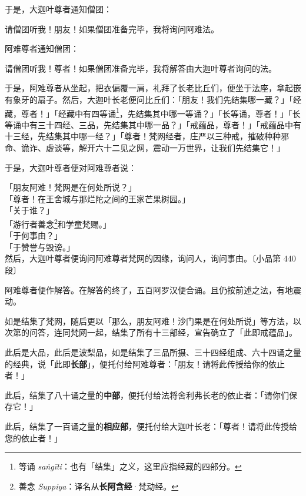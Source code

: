 于是，大迦叶尊者通知僧团：

\begin{quoting}请僧团听我！朋友！如果僧团准备完毕，我将询问阿难法。\end{quoting}

阿难尊者通知僧团：

\begin{quoting}请僧团听我！尊者！如果僧团准备完毕，我将解答由大迦叶尊者询问的法。\end{quoting}

于是，阿难尊者从坐起，把衣偏覆一肩，礼拜了长老比丘们，便坐于法座，拿起嵌有象牙的扇子。然后，大迦叶长老便问比丘们：「朋友！我们先结集哪一藏？」「经藏，尊者！」「经藏中有四等诵\footnote{等诵 \textit{saṅgīti}：也有「结集」之义，这里应指经藏的四部分。}，先结集其中哪一等诵？」「长等诵，尊者！」「长等诵中有三十四经、三品，先结集其中哪一品？」「戒蕴品，尊者！」「戒蕴品中有十三经，先结集其中哪一经？」「尊者！梵网经者，庄严以三种戒，摧破种种邪命、诡诈、虚谈等，解开六十二见之网，震动一万世界，让我们先结集它！」

于是，大迦叶尊者便对阿难尊者说：

\begin{quoting}「朋友阿难！梵网是在何处所说？」\\「尊者！在王舍城与那烂陀之间的王家芒果树园。」\\「关于谁？」\\「游行者善念\footnote{善念 \textit{Suppiya}：译名从\textbf{长阿含经}·梵动经。}和学童梵赐。」\\「于何事由？」\\「于赞誉与毁谤。」\\然后，大迦叶尊者便询问阿难尊者梵网的因缘，询问人，询问事由。{\bluefootnotesize 〔小品第 440 段〕}\end{quoting}

阿难尊者便作解答。在解答的终了，五百阿罗汉便合诵。且仍按前述之法，有地震动。

如是结集了梵网，随后更以「那么，朋友阿难！沙门果是在何处所说」等方法，以次第的问答，连同梵网一起，结集了所有十三部经，宣告确立了「此即戒蕴品」。

此后是大品，此后是波梨品，如是结集了三品所摄、三十四经组成、六十四诵之量的经典，说「此即\textbf{长部}」，便托付给阿难尊者：「朋友！请将此传授给你的依止者！」

此后，结集了八十诵之量的\textbf{中部}，便托付给法将舍利弗长老的依止者：「请你们保存它！」

此后，结集了一百诵之量的\textbf{相应部}，便托付给大迦叶长老：「尊者！请将此传授给您的依止者！」

